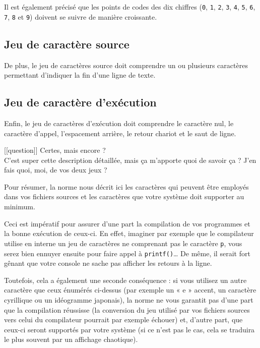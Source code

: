 \documentclass[]{article}
\begin{document}
Il est également précisé que les points de codes des dix chiffres
(\texttt{\textquotesingle{}0\textquotesingle{}},
\texttt{\textquotesingle{}1\textquotesingle{}},
\texttt{\textquotesingle{}2\textquotesingle{}},
\texttt{\textquotesingle{}3\textquotesingle{}},
\texttt{\textquotesingle{}4\textquotesingle{}},
\texttt{\textquotesingle{}5\textquotesingle{}},
\texttt{\textquotesingle{}6\textquotesingle{}},
\texttt{\textquotesingle{}7\textquotesingle{}},
\texttt{\textquotesingle{}8\textquotesingle{}} et
\texttt{\textquotesingle{}9\textquotesingle{}}) doivent se suivre de
manière croissante.

\subsection{Jeu de caractère source}\label{jeu-de-caractuxe8re-source}

De plus, le jeu de caractères source doit comprendre un ou plusieurs
caractères permettant d'indiquer la fin d'une ligne de texte.

\subsection{Jeu de caractère
d'exécution}\label{jeu-de-caractuxe8re-dexuxe9cution}

Enfin, le jeu de caractères d'exécution doit comprendre le caractère
nul, le caractère d'appel, l'espacement arrière, le retour chariot et le
saut de ligne.

{[}{[}question{]}{]} \textbar{} Certes, mais encore ?\\
\textbar{} C'est super cette description détaillée, mais ça m'apporte
quoi de savoir ça ? J'en fais quoi, moi, de vos deux jeux ?

Pour résumer, la norme nous décrit ici les caractères qui peuvent être
employés dans vos fichiers sources et les caractères que votre système
doit supporter au minimum.

Ceci est impératif pour assurer d'une part la compilation de vos
programmes et la bonne exécution de ceux-ci. En effet, imaginer par
exemple que le compilateur utilise en interne un jeu de caractères ne
comprenant pas le caractère \texttt{p}, vous serez bien ennuyer ensuite
pour faire appel à \texttt{printf()}\ldots{} De même, il serait fort
gênant que votre console ne sache pas afficher les retours à la ligne.

Toutefois, cela a également une seconde conséquence : si vous utilisez
un autre caractère que ceux énumérés ci-dessus (par exemple un « e »
accent, un caractère cyrillique ou un idéogramme japonais), la norme ne
vous garantit pas d'une part que la compilation réussisse (la conversion
du jeu utilisé par vos fichiers sources vers celui du compilateur
pourrait par exemple échouer) et, d'autre part, que ceux-ci seront
supportés par votre système (si ce n'est pas le cas, cela se traduira le
plus souvent par un affichage chaotique).
\end{document}
